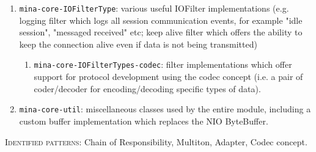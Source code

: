 \begin{enumerate}
    \item \texttt{mina-core-IOFilterType}: various useful IOFilter implementations (e.g. logging filter which logs all session communication events, for example "idle session", "messaged received" etc; keep alive filter which offers the ability to keep the connection alive even if data is not being transmitted)
        \begin{enumerate}
            \item \texttt{mina-core-IOFilterTypes-codec}: filter implementations which offer support for protocol development using the codec concept (i.e. a pair of coder/decoder for encoding/decoding specific types of data). 
        \end{enumerate}
    \item \texttt{mina-core-util}: miscellaneous classes used by the entire module, including a custom buffer implementation which replaces the NIO ByteBuffer.
\end{enumerate}
\textsc{Identified patterns}: Chain of Responsibility, Multiton, Adapter, Codec concept.

